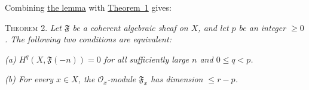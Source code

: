 Combining \hyperref[fac:III:5:no:74:lemma:1]{the lemma} with
\hyperref[fac:III:5:no:74:thm:1]{Theorem~1} gives:

\label{fac:III:5:no:74:thm:2}
\textsc{Theorem 2.} \textit{Let $\mathfrak F$ be a coherent algebraic
sheaf on $X$, and let $p$ be an integer $\geq0$. The following two
conditions are equivalent:}

\label{fac:III:5:no:74:thm:2:a}
\textit{(a) $H^q(X,\mathfrak F(-n))=0$ for all sufficiently large $n$
and $0\leq q<p$.}

\label{fac:III:5:no:74:thm:2:b}
\textit{(b) For every $x\in X$, the $\mathcal O_x$-module
$\mathfrak F_x$ has dimension $\leq r-p$.}
